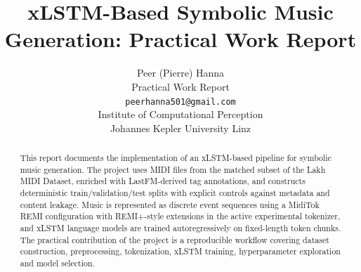 \documentclass{article}
\title{xLSTM-Based Symbolic Music Generation: Practical Work Report}
\author{%
  Peer (Pierre) Hanna \\
  Practical Work Report\\
  \texttt{peerhanna501@gmail.com} \\ 
  Institute of Computational Perception \\
  Johannes Kepler University Linz
}
\begin{document}
\maketitle

\begin{abstract}
	This report documents the implementation of an xLSTM-based pipeline for symbolic music generation. The project uses MIDI files from the matched subset of the Lakh MIDI Dataset, enriched with LastFM-derived tag annotations, and constructs deterministic train/validation/test splits with explicit controls against metadata and content leakage. Music is represented as discrete event sequences using a MidiTok REMI configuration with REMI+-style extensions in the active experimental tokenizer, and xLSTM language models are trained autoregressively on fixed-length token chunks. The practical contribution of the project is a reproducible workflow covering dataset construction, preprocessing, tokenization, xLSTM training, hyperparameter exploration and model selection.
\end{abstract}

























%







\end{document}
